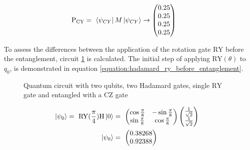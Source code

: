 \begin{equation}
    \centering
    \begin{split}
         \mathrm{P_{CY}} &=\ \bra{\psi_{CY}}M\ket{\psi_{CY}} \rightarrow \begin{pmatrix}
         0.25\\
         0.25\\
         0.25\\
         0.25\\
     \end{pmatrix}
    \end{split}
    \label{equation:cy_entanglement_with_ry}
\end{equation}

To assess the differences between the application of the rotation gate $\mathrm{RY}$ before the entanglement, circuit \ref{fig:circuit_ry_gate_cz_entangled} is calculated. The initial step of applying $\mathrm{RY}(\theta)$ to $q_0$, is demonstrated in equation \ref{equation:hadamard_ry_before_entanglement}.

\begin{figure}[!ht]
    \centering
    \caption{Quantum circuit with two qubits, two Hadamard gates, single $\mathrm{RY}$ gate and entangled with a $\mathrm{CZ}$ gate}
    \label{fig:circuit_ry_gate_cz_entangled}
\end{figure}

\begin{equation}
        \centering
    \begin{split}
          \ket{\psi_0} =\ \mathrm{RY}(\frac{\pi}{4})\mathrm{H}\ket{0} &=\ \begin{pmatrix}
        \cos{\frac{\pi}{8}} & -\sin{\frac{\pi}{8}} \\
        \sin{\frac{\pi}{8}} & \cos{\frac{\pi}{8}}
    \end{pmatrix}\begin{pmatrix}\frac{1}{\sqrt{2}}\\\frac{1}{\sqrt{2}}\end{pmatrix} \\
    \ket{\psi_0} &=\ \begin{pmatrix}
     0.38268\\
     0.92388\\
     \end{pmatrix}
    \end{split}
    \label{equation:hadamard_ry_before_entanglement}
\end{equation}

